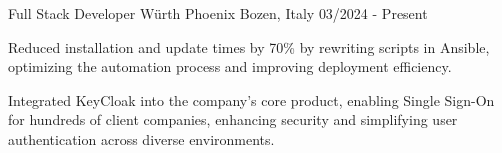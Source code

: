 

\begin{cventries}

	\cventry
	{Full Stack Developer} %
	{Würth Phoenix} %
	{Bozen, Italy} %
	{03/2024 - Present} %
	{
		\begin{cvitems} %
			\item Reduced installation and update times by 70\% by rewriting scripts in Ansible, optimizing the automation process and improving deployment efficiency.
			\item Integrated KeyCloak into the company's core product, enabling Single Sign-On for hundreds of client companies, enhancing security and simplifying user authentication across diverse environments.
		\end{cvitems}
	}

\end{cventries}
